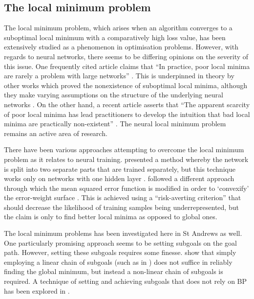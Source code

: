 \subsection{The local minimum problem}
\label{sec:context_local_minimum_problem}
The local minimum problem, which arises when an algorithm converges to a suboptimal local minimum with a comparatively high loss value, has been extensively studied as a phenomenon in optimisation problems.
However, with regards to neural networks, there seems to be differing opinions on the severity of this issue. 
One frequently cited article claims that ``In practice, poor local minima are rarely a problem with large networks'' \cite{lecun2015}.
This is underpinned in theory by other works which proved the nonexistence of suboptimal local minima, although they make varying assumptions on the structure of the underlying neural networks \cite{kawaguchi2016,nguyen2018,laurent2018}.
On the other hand, a recent article asserts that ``The apparent scarcity of poor local minima has lead practitioners to develop the intuition that bad local minima \elide are practically non-existent'' \cite{goldblum2019}.
The neural local minimum problem remains an active area of research.

There have been various approaches attempting to overcome the local minimum problem as it relates to neural training.
\citeauthor{choi2008} presented a method whereby the network is split into two separate parts that are trained separately, but this technique works only on networks with one hidden layer \cite*{choi2008}.
\citeauthor{lo2012} followed a different approach through which the mean squared error function is modified in order to `convexify' the error-weight surface \cite*{lo2012,lo2017}.
This is achieved using a ``risk-averting criterion'' that should decrease the likelihood of training samples being underrepresented, but the claim is only to find better local minima as opposed to global ones.

The local minimum problems has been investigated here in St Andrews as well. 
One particularly promising approach seems to be setting subgoals on the goal path.
However, setting these subgoals requires some finesse.
\textcite{lewis1999} show that simply employing a linear chain of subgoals (such as in \textcite{gorse1997}) does not suffice in reliably finding the global minimum, but instead a non-linear chain of subgoals is required.
A technique of setting and achieving subgoals that does not rely on BP has been explored in \textcite{weir2000}.

